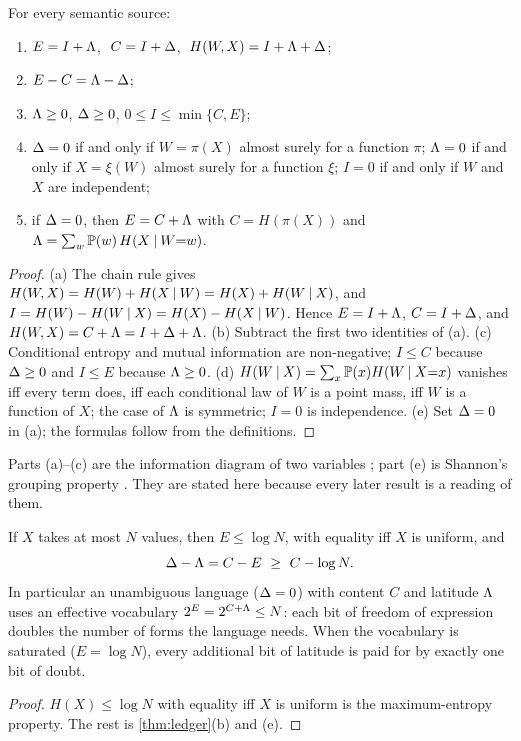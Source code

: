 \begin{theorem}\label{thm:ledger}
For every semantic source:
\begin{enumerate}[label=\textup{(\alph*)}]
\item $E=I+\Lambda$, $\;C=I+\Delta$, $\;H(W,X)=I+\Lambda+\Delta$;
\item $E-C=\Lambda-\Delta$;
\item $\Lambda\ge0$, $\Delta\ge0$, $0\le I\le\min\{C,E\}$;
\item $\Delta=0$ if and only if $W=\pi(X)$ almost surely for a function $\pi$; $\Lambda=0$ if and only if $X=\xi(W)$ almost surely for a function $\xi$; $I=0$ if and only if $W$ and $X$ are independent;
\item if $\Delta=0$, then $E=C+\Lambda$ with $C=H(\pi(X))$ and $\Lambda=\sum_w\mathbb{P}(w)\,H(X\mathbin{\vert} W{=}w)$.
\end{enumerate}
\end{theorem}
\begin{proof}
(a) The chain rule gives $H(W,X)=H(W)+H(X\mathbin{\vert} W)=H(X)+H(W\mathbin{\vert} X)$, and $I=H(W)-H(W\mathbin{\vert} X)=H(X)-H(X\mathbin{\vert} W)$. Hence $E=I+\Lambda$, $C=I+\Delta$, and $H(W,X)=C+\Lambda=I+\Delta+\Lambda$.
(b) Subtract the first two identities of (a).
(c) Conditional entropy and mutual information are non-negative; $I\le C$ because $\Delta\ge0$ and $I\le E$ because $\Lambda\ge0$.
(d) $H(W\mathbin{\vert} X)=\sum_x\mathbb{P}(x)H(W\mathbin{\vert} X{=}x)$ vanishes iff every term does, iff each conditional law of $W$ is a point mass, iff $W$ is a function of $X$; the case of $\Lambda$ is symmetric; $I=0$ is independence.
(e) Set $\Delta=0$ in (a); the formulas follow from the definitions.
\end{proof}
Parts (a)--(c) are the information diagram of two variables \citep{yeung1991}; part (e) is Shannon's grouping property \citep{shannon1948}. They are stated here because every later result is a reading of them.

\begin{corollary}\label{cor:vocab}
If $X$ takes at most $N$ values, then $E\le\log N$, with equality iff $X$ is uniform, and
\begin{equation}
\Delta-\Lambda=C-E\ \ge\ C-\log N .
\end{equation}
In particular an unambiguous language ($\Delta=0$) with content $C$ and latitude $\Lambda$ uses an effective vocabulary $2^{E}=2^{C+\Lambda}\le N$: each bit of freedom of expression doubles the number of forms the language needs. When the vocabulary is saturated ($E=\log N$), every additional bit of latitude is paid for by exactly one bit of doubt.
\end{corollary}
\begin{proof}
$H(X)\le\log N$ with equality iff $X$ is uniform is the maximum-entropy property. The rest is \cref{thm:ledger}(b) and (e).
\end{proof}


